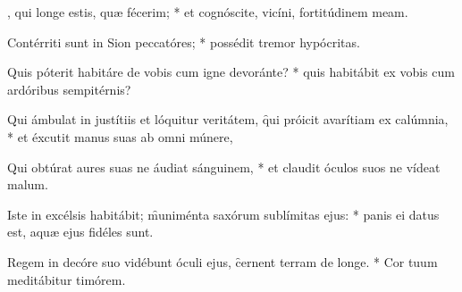 \begin{psalmus}

		, qui longe estis, quæ fécerim; * et cognóscite, vicíni, fortitúdinem meam.

		 Contérriti sunt in Sion peccatóres; * possédit tremor hypócritas.

		 Quis póterit habitáre de vobis cum igne devoránte? * quis habitábit ex vobis cum ardóribus sempitérnis?

		 Qui ámbulat in justítiis et lóquitur veritátem, \f qui próicit avarítiam ex calúmnia, * et éxcutit manus suas ab omni múnere,

		 Qui obtúrat aures suas ne áudiat sánguinem, * et claudit óculos suos ne vídeat malum.

		 Iste in excélsis habitábit; \f muniménta saxórum sublímitas ejus: * panis ei datus est, aquæ ejus fidéles sunt.

		 Regem in decóre suo vidébunt óculi ejus, \f cernent terram de longe. * Cor tuum meditábitur timórem.

\end{psalmus}
